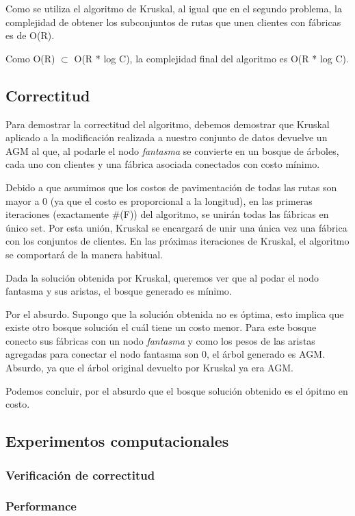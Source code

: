 \documentclass[a4paper, 10pt, twoside]{article}
\begin{document}
Como se utiliza el algoritmo de Kruskal, al igual que en el segundo problema, la complejidad de obtener los subconjuntos de rutas que unen clientes con fábricas es de O(R).

Como O(R) $\subset$ O(R * log C), la complejidad final del algoritmo es O(R * log C).
\subsection{Correctitud}
Para demostrar la correctitud del algoritmo, debemos demostrar que Kruskal aplicado a la modificación realizada a nuestro conjunto de datos devuelve un AGM al que, al podarle el nodo \textit{fantasma} se convierte en un bosque de árboles, cada uno con clientes y una fábrica asociada conectados con costo mínimo.

Debido a que asumimos que los costos de pavimentación de todas las rutas son mayor a 0 (ya que el costo es proporcional a la longitud), en las primeras iteraciones (exactamente \#(F)) del algoritmo, se unirán todas las fábricas en único set. Por esta unión, Kruskal se encargará de unir una única vez una fábrica con los conjuntos de clientes. En las próximas iteraciones de Kruskal, el algoritmo se comportará  de la manera habitual.

Dada la solución obtenida por Kruskal, queremos ver que al podar el nodo fantasma y sus aristas, el bosque generado es mínimo.

Por el absurdo. Supongo que la solución obtenida no es óptima, esto implica que existe otro bosque solución el cuál tiene un costo menor. Para este bosque conecto sus fábricas con un nodo \textit{fantasma} y como los pesos de las aristas agregadas para conectar el nodo fantasma son 0, el árbol generado es AGM. Absurdo, ya que el árbol original devuelto por Kruskal ya era AGM.

Podemos concluir, por el absurdo que el bosque solución obtenido es el ópitmo en costo.

\subsection{Experimentos computacionales}

\subsubsection{Verificación de correctitud}

\subsubsection{Performance}
\end{document}
